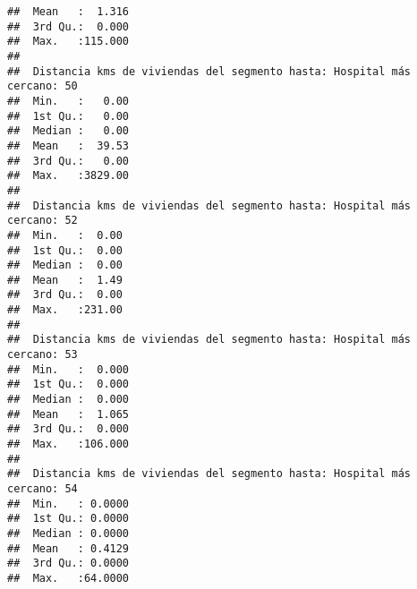 \documentclass[11pt,]{article}
\begin{document}
\begin{verbatim}
##  Mean   :  1.316                                                        
##  3rd Qu.:  0.000                                                        
##  Max.   :115.000                                                        
##                                                                         
##  Distancia kms de viviendas del segmento hasta: Hospital más cercano: 50
##  Min.   :   0.00                                                        
##  1st Qu.:   0.00                                                        
##  Median :   0.00                                                        
##  Mean   :  39.53                                                        
##  3rd Qu.:   0.00                                                        
##  Max.   :3829.00                                                        
##                                                                         
##  Distancia kms de viviendas del segmento hasta: Hospital más cercano: 52
##  Min.   :  0.00                                                         
##  1st Qu.:  0.00                                                         
##  Median :  0.00                                                         
##  Mean   :  1.49                                                         
##  3rd Qu.:  0.00                                                         
##  Max.   :231.00                                                         
##                                                                         
##  Distancia kms de viviendas del segmento hasta: Hospital más cercano: 53
##  Min.   :  0.000                                                        
##  1st Qu.:  0.000                                                        
##  Median :  0.000                                                        
##  Mean   :  1.065                                                        
##  3rd Qu.:  0.000                                                        
##  Max.   :106.000                                                        
##                                                                         
##  Distancia kms de viviendas del segmento hasta: Hospital más cercano: 54
##  Min.   : 0.0000                                                        
##  1st Qu.: 0.0000                                                        
##  Median : 0.0000                                                        
##  Mean   : 0.4129                                                        
##  3rd Qu.: 0.0000                                                        
##  Max.   :64.0000                                                        

\end{verbatim}
\end{document}
